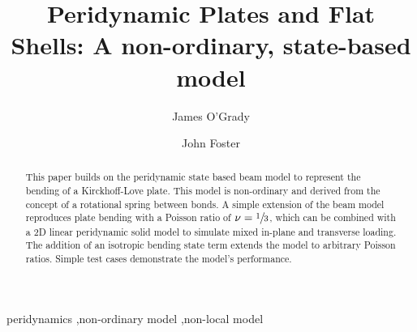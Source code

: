 \documentclass[preprint,review,12pt]{elsarticle}
\begin{document}
\begin{frontmatter}

\title{Peridynamic Plates and Flat Shells: A non-ordinary, state-based model}

\author[utsa]{James O'Grady}

\author[utsa]{John Foster}


\address[utsa]{The University of Texas at San Antonio, One UTSA Circle, San Antonio, TX 78249}

\begin{abstract}
This paper builds on the peridynamic state based beam model to represent the bending of a Kirckhoff-Love plate.  This model is non-ordinary and derived from the concept of a rotational spring between bonds.
A simple extension of the beam model reproduces plate bending with a Poisson ratio of \(\nu=\sfrac{1}{3}\), which can be combined with a 2D linear peridynamic solid model to simulate mixed in-plane and transverse loading.  The addition of an isotropic bending state term extends the model to arbitrary Poisson ratios.
Simple test cases demonstrate the model's performance.
\end{abstract}

\begin{keyword}
peridynamics \sep non-ordinary model \sep non-local model
\end{keyword}

\end{frontmatter}
\end{document}
